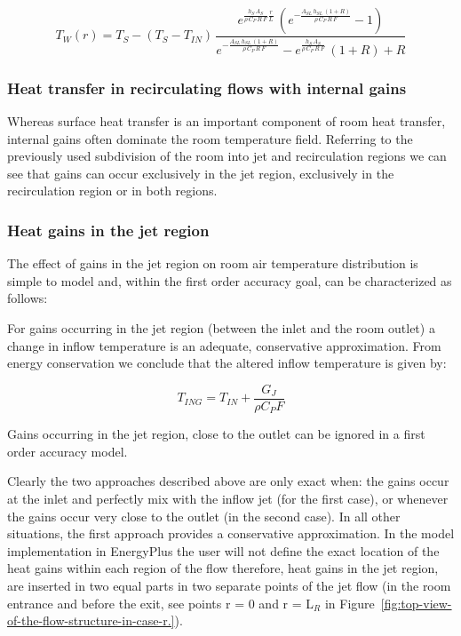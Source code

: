 \begin{equation}
{T_W}(r) = {T_S} - ({T_S} - {T_{IN}})\,\frac{{{e^{\frac{{{h_S}\,{A_S}}}{{\rho \,{C_P}\,R\,F}}\frac{r}{{{L_{}}}}}}\,({e^{ - \frac{{{A_{SL}}\,{h_{SL}}\,(1 + R)}}{{\rho \,{C_P}\,R\,F}}}} - 1)}}{{{e^{ - \frac{{{A_{SL}}\,{h_{SL}}\,(1 + R)}}{{\rho \,{C_P}\,R\,F}}}} - {e^{\frac{{{h_S}\,{A_S}}}{{\rho \,{C_P}\,R\,F}}}}\,(1 + R) + R}}
\end{equation}

\subsubsection{Heat transfer in recirculating flows with internal gains}\label{heat-transfer-in-recirculating-flows-with-internal-gains}

Whereas surface heat transfer is an important component of room heat transfer, internal gains often dominate the room temperature field. Referring to the previously used subdivision of the room into jet and recirculation regions we can see that gains can occur exclusively in the jet region, exclusively in the recirculation region or in both regions.

\subsubsection{Heat gains in the jet region}\label{heat-gains-in-the-jet-region}

The effect of gains in the jet region on room air temperature distribution is simple to model and, within the first order accuracy goal, can be characterized as follows:

For gains occurring in the jet region (between the inlet and the room outlet) a change in inflow temperature is an adequate, conservative approximation. From energy conservation we conclude that the altered inflow temperature is given by:

\begin{equation}
{T_{ING}} = {T_{IN}} + \frac{{{G_J}}}{{\rho {C_P}F}}
\end{equation}

Gains occurring in the jet region, close to the outlet can be ignored in a first order accuracy model.

Clearly the two approaches described above are only exact when: the gains occur at the inlet and perfectly mix with the inflow jet (for the first case), or whenever the gains occur very close to the outlet (in the second case). In all other situations, the first approach provides a conservative approximation. In the model implementation in EnergyPlus the user will not define the exact location of the heat gains within each region of the flow therefore, heat gains in the jet region, are inserted in two equal parts in two separate points of the jet flow (in the room entrance and before the exit, see points r = 0 and r = L\(_{R}\) in Figure~\ref{fig:top-view-of-the-flow-structure-in-case-r.}).

